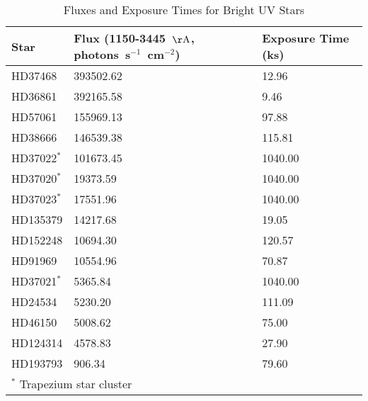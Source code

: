 \begin{table*}
\caption{Fluxes and Exposure Times for Bright UV Stars\label{tab:star_fluxes}}
\begin{center}
\begin{tabular}{lll}
\hline
\hline
Star & Flux (1150-3445~${\rm \AA}$, photons~s$^{-1}$~cm$^{-2}$) & Exposure Time (ks) \\
\hline
HD37468 & 393502.62 & 12.96 \\
HD36861 & 392165.58 & 9.46 \\
HD57061 & 155969.13 & 97.88 \\
HD38666 & 146539.38 & 115.81 \\
HD37022$^*$ & 101673.45 & 1040.00 \\
HD37020$^*$ & 19373.59 & 1040.00 \\
HD37023$^*$ & 17551.96 & 1040.00 \\
HD135379 & 14217.68 & 19.05 \\
HD152248 & 10694.30 & 120.57 \\
HD91969 & 10554.96 & 70.87 \\
HD37021$^*$ & 5365.84 & 1040.00 \\
HD24534 & 5230.20 & 111.09 \\
HD46150 & 5008.62 & 75.00 \\
HD124314 & 4578.83 & 27.90 \\
HD193793 & 906.34 & 79.60 \\
\hline
\multicolumn{3}{p{.6\textwidth}}{$^*$ Trapezium star cluster}
\end{tabular}
\end{center}
\end{table*}
